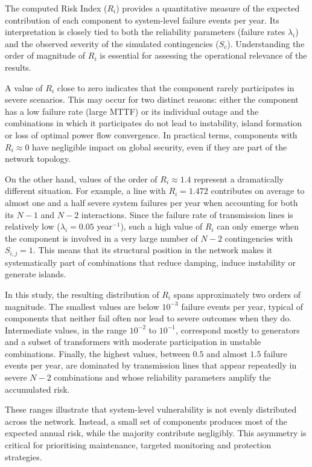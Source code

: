 \documentclass[journal]{IEEEtran}
\begin{document}
The computed Risk Index ($R_i$) provides a quantitative measure of the expected contribution of each component to system-level failure events per year. Its interpretation is closely tied to both the reliability parameters (failure rates $\lambda_i$) and the observed severity of the simulated contingencies ($S_c$). Understanding the order of magnitude of $R_i$ is essential for assessing the operational relevance of the results.

A value of $R_i$ close to zero indicates that the component rarely participates in severe scenarios. This may occur for two distinct reasons: either the component has a low failure rate (large MTTF) or its individual outage and the combinations in which it participates do not lead to instability, island formation or loss of optimal power flow convergence. In practical terms, components with $R_i \approx 0$ have negligible impact on global security, even if they are part of the network topology.

On the other hand, values of the order of $R_i \approx 1.4$ represent a dramatically different situation. For example, a line with $R_i = 1.472$ contributes on average to almost one and a half severe system failures per year when accounting for both its $N-1$ and $N-2$ interactions. Since the failure rate of transmission lines is relatively low ($\lambda_i = 0.05$ year$^{-1}$), such a high value of $R_i$ can only emerge when the component is involved in a very large number of $N-2$ contingencies with $S_{i,j} = 1$. This means that its structural position in the network makes it systematically part of combinations that reduce damping, induce instability or generate islands.

In this study, the resulting distribution of $R_i$ spans approximately two orders of magnitude. The smallest values are below $10^{-3}$ failure events per year, typical of components that neither fail often nor lead to severe outcomes when they do. Intermediate values, in the range $10^{-2}$ to $10^{-1}$, correspond mostly to generators and a subset of transformers with moderate participation in unstable combinations. Finally, the highest values, between $0.5$ and almost $1.5$ failure events per year, are dominated by transmission lines that appear repeatedly in severe $N-2$ combinations and whose reliability parameters amplify the accumulated risk.

These ranges illustrate that system-level vulnerability is not evenly distributed across the network. Instead, a small set of components produces most of the expected annual risk, while the majority contribute negligibly. This asymmetry is critical for prioritising maintenance, targeted monitoring and protection strategies.
\end{document}
